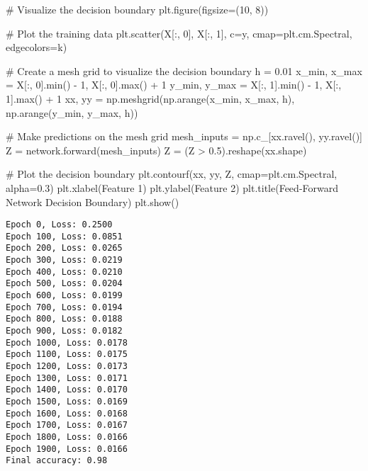 \documentclass[
  letterpaper,
  DIV=11,
  numbers=noendperiod]{scrreprt}
\newenvironment{Shaded}{\begin{snugshade}}{\end{snugshade}}
\newcommand{\BuiltInTok}[1]{\textcolor[rgb]{0.00,0.23,0.31}{#1}}
\newcommand{\CommentTok}[1]{\textcolor[rgb]{0.37,0.37,0.37}{#1}}
\newcommand{\DecValTok}[1]{\textcolor[rgb]{0.68,0.00,0.00}{#1}}
\newcommand{\FloatTok}[1]{\textcolor[rgb]{0.68,0.00,0.00}{#1}}
\newcommand{\NormalTok}[1]{\textcolor[rgb]{0.00,0.23,0.31}{#1}}
\newcommand{\OperatorTok}[1]{\textcolor[rgb]{0.37,0.37,0.37}{#1}}
\newcommand{\StringTok}[1]{\textcolor[rgb]{0.13,0.47,0.30}{#1}}
\begin{document}
\begin{Shaded}
\begin{Highlighting}[]
\CommentTok{\# Visualize the decision boundary}
\NormalTok{plt.figure(figsize}\OperatorTok{=}\NormalTok{(}\DecValTok{10}\NormalTok{, }\DecValTok{8}\NormalTok{))}

\CommentTok{\# Plot the training data}
\NormalTok{plt.scatter(X[:, }\DecValTok{0}\NormalTok{], X[:, }\DecValTok{1}\NormalTok{], c}\OperatorTok{=}\NormalTok{y, cmap}\OperatorTok{=}\NormalTok{plt.cm.Spectral, edgecolors}\OperatorTok{=}\StringTok{\textquotesingle{}k\textquotesingle{}}\NormalTok{)}

\CommentTok{\# Create a mesh grid to visualize the decision boundary}
\NormalTok{h }\OperatorTok{=} \FloatTok{0.01}
\NormalTok{x\_min, x\_max }\OperatorTok{=}\NormalTok{ X[:, }\DecValTok{0}\NormalTok{].}\BuiltInTok{min}\NormalTok{() }\OperatorTok{{-}} \DecValTok{1}\NormalTok{, X[:, }\DecValTok{0}\NormalTok{].}\BuiltInTok{max}\NormalTok{() }\OperatorTok{+} \DecValTok{1}
\NormalTok{y\_min, y\_max }\OperatorTok{=}\NormalTok{ X[:, }\DecValTok{1}\NormalTok{].}\BuiltInTok{min}\NormalTok{() }\OperatorTok{{-}} \DecValTok{1}\NormalTok{, X[:, }\DecValTok{1}\NormalTok{].}\BuiltInTok{max}\NormalTok{() }\OperatorTok{+} \DecValTok{1}
\NormalTok{xx, yy }\OperatorTok{=}\NormalTok{ np.meshgrid(np.arange(x\_min, x\_max, h),}
\NormalTok{                     np.arange(y\_min, y\_max, h))}

\CommentTok{\# Make predictions on the mesh grid}
\NormalTok{mesh\_inputs }\OperatorTok{=}\NormalTok{ np.c\_[xx.ravel(), yy.ravel()]}
\NormalTok{Z }\OperatorTok{=}\NormalTok{ network.forward(mesh\_inputs)}
\NormalTok{Z }\OperatorTok{=}\NormalTok{ (Z }\OperatorTok{\textgreater{}} \FloatTok{0.5}\NormalTok{).reshape(xx.shape)}

\CommentTok{\# Plot the decision boundary}
\NormalTok{plt.contourf(xx, yy, Z, cmap}\OperatorTok{=}\NormalTok{plt.cm.Spectral, alpha}\OperatorTok{=}\FloatTok{0.3}\NormalTok{)}
\NormalTok{plt.xlabel(}\StringTok{\textquotesingle{}Feature 1\textquotesingle{}}\NormalTok{)}
\NormalTok{plt.ylabel(}\StringTok{\textquotesingle{}Feature 2\textquotesingle{}}\NormalTok{)}
\NormalTok{plt.title(}\StringTok{\textquotesingle{}Feed{-}Forward Network Decision Boundary\textquotesingle{}}\NormalTok{)}
\NormalTok{plt.show()}
\end{Highlighting}
\end{Shaded}

\begin{verbatim}
Epoch 0, Loss: 0.2500
Epoch 100, Loss: 0.0851
Epoch 200, Loss: 0.0265
Epoch 300, Loss: 0.0219
Epoch 400, Loss: 0.0210
Epoch 500, Loss: 0.0204
Epoch 600, Loss: 0.0199
Epoch 700, Loss: 0.0194
Epoch 800, Loss: 0.0188
Epoch 900, Loss: 0.0182
Epoch 1000, Loss: 0.0178
Epoch 1100, Loss: 0.0175
Epoch 1200, Loss: 0.0173
Epoch 1300, Loss: 0.0171
Epoch 1400, Loss: 0.0170
Epoch 1500, Loss: 0.0169
Epoch 1600, Loss: 0.0168
Epoch 1700, Loss: 0.0167
Epoch 1800, Loss: 0.0166
Epoch 1900, Loss: 0.0166
Final accuracy: 0.98
\end{verbatim}
\end{document}
